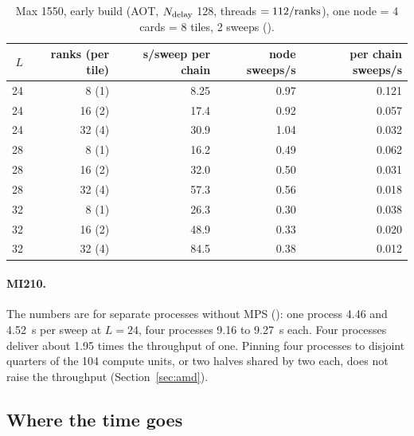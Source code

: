 \begin{table}[h]
\centering
\caption{Max 1550, early build (AOT, $N_{\rm delay}$ 128, threads $=112/{\rm ranks}$), one node = 4 cards = 8 tiles, 2 sweeps ().}
\label{tab:pvcmatrix}
\small
\begin{tabular}{@{}rrrrr@{}}
\toprule
$L$ & ranks (per tile) & s/sweep per chain & node sweeps/s & per chain sweeps/s \\
\midrule
24 & 8 (1) & 8.25 & 0.97 & 0.121 \\ %
24 & 16 (2) & 17.4 & 0.92 & 0.057 \\
24 & 32 (4) & 30.9 & 1.04 & 0.032 \\
28 & 8 (1) & 16.2 & 0.49 & 0.062 \\
28 & 16 (2) & 32.0 & 0.50 & 0.031 \\
28 & 32 (4) & 57.3 & 0.56 & 0.018 \\
32 & 8 (1) & 26.3 & 0.30 & 0.038 \\
32 & 16 (2) & 48.9 & 0.33 & 0.020 \\
32 & 32 (4) & 84.5 & 0.38 & 0.012 \\
\bottomrule
\end{tabular}
\end{table}

\paragraph{MI210.} The numbers are for separate processes without MPS (): one process 4.46 and 4.52~s per sweep at $L=24$, four processes 9.16 to 9.27~s each. Four processes deliver about 1.95 times the throughput of one. Pinning four processes to disjoint quarters of the 104 compute units, or two halves shared by two each, does not raise the throughput (Section~\ref{sec:amd}).

\subsection{Where the time goes}
\label{sec:breakdown}

